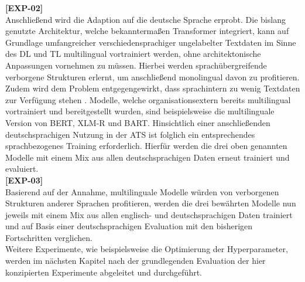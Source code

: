\noindent
\textbf{[EXP-02]}\\
\noindent
Anschließend wird die Adaption auf die deutsche Sprache erprobt. Die bislang genutzte Architektur, welche bekanntermaßen Transformer integriert, kann auf Grundlage umfangreicher verschiedensprachiger ungelabelter Textdaten im Sinne des \ac{DL} und \ac{TL} multilingual vortrainiert werden, ohne architektonische Anpassungen vornehmen zu müssen. Hierbei werden sprachübergreifende verborgene Strukturen erlernt, um anschließend monolingual davon zu profitieren. Zudem wird dem Problem entgegengewirkt, dass sprachintern zu wenig Textdaten zur Verfügung stehen \cite{MOB20}. Modelle, welche organisationsextern bereits multilingual vortrainiert und bereitgestellt wurden, sind beispielsweise die multilinguale Version von \ac{BERT}, \ac{XLM-R} und \ac{BART}. Hinsichtlich einer anschließenden deutschsprachigen Nutzung in der \ac{ATS} ist folglich ein entsprechendes sprachbezogenes Training erforderlich. Hierfür werden die drei oben genannten Modelle mit einem Mix aus allen deutschsprachigen Daten erneut trainiert und evaluiert.\\

\noindent
\textbf{[EXP-03]}\\
\noindent
Basierend auf der Annahme, multilinguale Modelle würden von verborgenen Strukturen anderer Sprachen profitieren, werden die drei bewährten Modelle nun jeweils mit einem Mix aus allen englisch- und deutschsprachigen Daten trainiert und auf Basis einer deutschsprachigen Evaluation mit den bisherigen Fortschritten verglichen.\\

\noindent
Weitere Experimente, wie beispielsweise die Optimierung der Hyperparameter, werden im nächsten Kapitel nach der grundlegenden Evaluation der hier konzipierten Experimente abgeleitet und durchgeführt.

